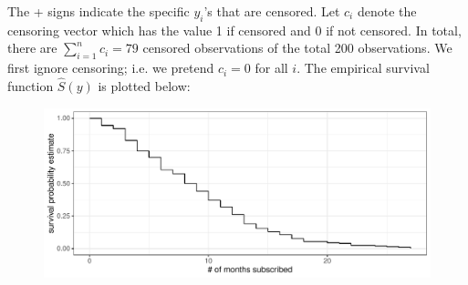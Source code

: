\documentclass[12pt]{article}
\begin{document}
\noindent The + signs indicate the specific $y_i$'s that are censored. Let $c_i$ denote the censoring vector which has the value 1 if censored and 0 if not censored. In total, there are $\sum_{i=1}^n c_i = 79$ censored observations of the total 200 observations. We first ignore censoring; i.e. we pretend $c_i = 0$ for all $i$. The empirical survival function $\hat{S}(y)$ is plotted below:

\begin{figure}[htp]
\centering
\includegraphics[width=4.5in]{survival_censoring_ignored}
\end{figure}
\end{document}
